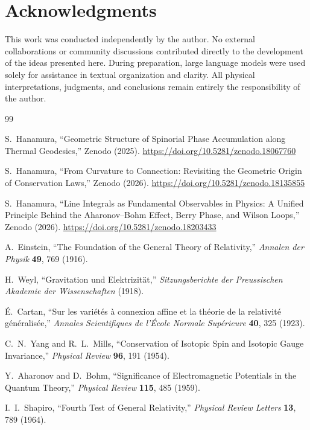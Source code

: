 \documentclass[12pt,letterpaper]{article}
\begin{document}
\section*{Acknowledgments}

This work was conducted independently by the author. No external collaborations or community discussions contributed directly to the development of the ideas presented here. During preparation, large language models were used solely for assistance in textual organization and clarity. All physical interpretations, judgments, and conclusions remain entirely the responsibility of the author.

\begin{thebibliography}{99}

S.~Hanamura, ``Geometric Structure of Spinorial Phase Accumulation along Thermal Geodesics,'' Zenodo (2025). \href{https://doi.org/10.5281/zenodo.18067760}{https://doi.org/10.5281/zenodo.18067760}

S.~Hanamura, ``From Curvature to Connection: Revisiting the Geometric Origin of Conservation Laws,'' Zenodo (2026). \href{https://doi.org/10.5281/zenodo.18135855}{https://doi.org/10.5281/zenodo.18135855}

S.~Hanamura, ``Line Integrals as Fundamental Observables in Physics: A Unified Principle Behind the Aharonov--Bohm Effect, Berry Phase, and Wilson Loops,'' Zenodo (2026). \href{https://doi.org/10.5281/zenodo.18203433}{https://doi.org/10.5281/zenodo.18203433}

A.~Einstein,
``The Foundation of the General Theory of Relativity,''
\textit{Annalen der Physik} \textbf{49}, 769 (1916).

H.~Weyl,
``Gravitation und Elektrizit\"at,''
\textit{Sitzungsberichte der Preussischen Akademie der Wissenschaften} (1918).

\'E.~Cartan,
``Sur les vari\'et\'es \`a connexion affine et la th\'eorie de la relativit\'e g\'en\'eralis\'ee,''
\textit{Annales Scientifiques de l'\'Ecole Normale Sup\'erieure} \textbf{40}, 325 (1923).

C.~N.~Yang and R.~L.~Mills,
``Conservation of Isotopic Spin and Isotopic Gauge Invariance,''
\textit{Physical Review} \textbf{96}, 191 (1954).

Y.~Aharonov and D.~Bohm,
``Significance of Electromagnetic Potentials in the Quantum Theory,''
\textit{Physical Review} \textbf{115}, 485 (1959).

I.~I.~Shapiro,
``Fourth Test of General Relativity,''
\textit{Physical Review Letters} \textbf{13}, 789 (1964).

\end{thebibliography}

\end{document}
